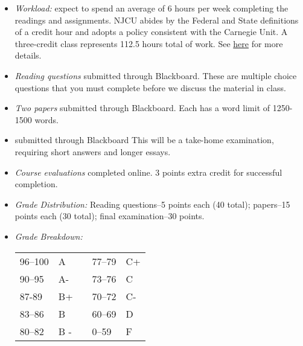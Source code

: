 \documentclass[article,oneside]{memoir}
\begin{document}
\begin{itemize}


\item \textit{Workload:} expect to spend an average of 6 hours per week completing the readings and assignments. NJCU abides by the Federal and State definitions of a credit hour and adopts a policy consistent with the Carnegie Unit. A three-credit class represents 112.5 hours total of work. See \href{http://scottoconnor.org/resources/Credit.pdf}{here} for more details.




\item \textit{Reading questions} submitted through Blackboard. These are multiple choice questions that you must complete before we discuss the material in class. 



\item \textit{Two papers} submitted through Blackboard. Each has a word limit of 1250-1500 words. 

\item {} submitted through Blackboard This will be a take-home examination, requiring short answers and longer essays.  

\item \textit{Course evaluations} completed online. 3 points extra credit for successful completion.

\item \textit{Grade Distribution:} Reading questions--5 points each (40 total); papers--15 points each (30 total); final examination--30 points.



\item \textit{Grade Breakdown:}

 \begin{tabular}{ | l | l | p{2cm} | l | l | }
    \hline 
96--100 & A  & &  77--79 &  C+ \\  
90--95 & A- & &  73--76 & C \\
87-89 & B+ &  &  70--72 & C- \\ 
83--86 & B  & &  60--69 & D\\
80--82 & B - & & 0--59 & F\\ \hline
    \end{tabular}


\end{itemize}
\end{document}

